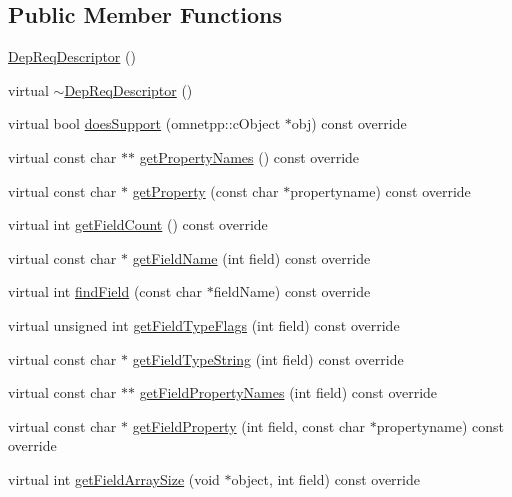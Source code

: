 \subsection*{Public Member Functions}
\begin{DoxyCompactItemize}
\item 
\hyperlink{classDepReqDescriptor_acc9a0e0eef48f3a21fc8ac17d63bf10a}{Dep\+Req\+Descriptor} ()
\item 
virtual \hyperlink{classDepReqDescriptor_a68e3426897aa8baff48b1acae276c967}{$\sim$\+Dep\+Req\+Descriptor} ()
\item 
virtual bool \hyperlink{classDepReqDescriptor_a1d6a05ff831c136608bac01b04cb8779}{does\+Support} (omnetpp\+::c\+Object $\ast$obj) const override
\item 
virtual const char $\ast$$\ast$ \hyperlink{classDepReqDescriptor_a1b9e8ad7d683c9e2d1396e48fd7ec24f}{get\+Property\+Names} () const override
\item 
virtual const char $\ast$ \hyperlink{classDepReqDescriptor_ae00fcc364ffe7494eaa0516f04c1e3f8}{get\+Property} (const char $\ast$propertyname) const override
\item 
virtual int \hyperlink{classDepReqDescriptor_a7ca06e0d74b9a2eb7c335a935a52938f}{get\+Field\+Count} () const override
\item 
virtual const char $\ast$ \hyperlink{classDepReqDescriptor_a8ef6ae7af9cb96791e005fd5e0c1e255}{get\+Field\+Name} (int field) const override
\item 
virtual int \hyperlink{classDepReqDescriptor_a9c2af40c798a0d7bbb671f175734836c}{find\+Field} (const char $\ast$field\+Name) const override
\item 
virtual unsigned int \hyperlink{classDepReqDescriptor_a67f19e0852007122a7ed1a3f773069ac}{get\+Field\+Type\+Flags} (int field) const override
\item 
virtual const char $\ast$ \hyperlink{classDepReqDescriptor_abccd49184b08f6cbf98825c5cef37252}{get\+Field\+Type\+String} (int field) const override
\item 
virtual const char $\ast$$\ast$ \hyperlink{classDepReqDescriptor_aedf5f2e33ed13cfb2d4584664dba743f}{get\+Field\+Property\+Names} (int field) const override
\item 
virtual const char $\ast$ \hyperlink{classDepReqDescriptor_a86446083bf6eecb500c464288794e4a0}{get\+Field\+Property} (int field, const char $\ast$propertyname) const override
\item 
virtual int \hyperlink{classDepReqDescriptor_a68402dadf251334b924fd9505c388bad}{get\+Field\+Array\+Size} (void $\ast$object, int field) const override

\end{DoxyCompactItemize}

